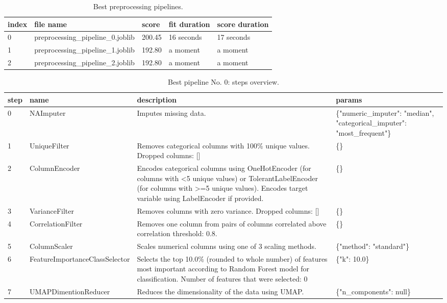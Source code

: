 \documentclass{article}%
\begin{document}
%


\begin{table}[H]%
\begin{center}%
\renewcommand{\arraystretch}{1.5}%
\begin{tabular}{l l l l l}%
\hline%
\textbf{index}&\textbf{file name}&\textbf{score}&\textbf{fit duration}&\textbf{score duration}\\%
\hline%
0&preprocessing\_pipeline\_0.joblib&200.45&16 seconds&17 seconds\\%
1&preprocessing\_pipeline\_1.joblib&192.80&a moment&a moment\\%
2&preprocessing\_pipeline\_2.joblib&192.80&a moment&a moment\\%
\hline%
\end{tabular}%
\end{center}%
\caption{Best preprocessing pipelines.}%
\end{table}

%


\begin{table}[H]%
\begin{center}%
\renewcommand{\arraystretch}{1.5}%
\begin{tabular}{p{7mm} p{50mm} p{80mm} p{40mm}}%
\hline%
\textbf{step}&\textbf{name}&\textbf{description}&\textbf{params}\\%
\hline%
0&NAImputer&Imputes missing data.&\{"numeric\_imputer": "median", "categorical\_imputer": "most\_frequent"\}\\%
1&UniqueFilter&Removes categorical columns with 100\% unique values. Dropped columns: {[}{]}&\{\}\\%
2&ColumnEncoder&Encodes categorical columns using OneHotEncoder (for columns with <5 unique values) or TolerantLabelEncoder (for columns with >=5 unique values). Encodes target variable using LabelEncoder if provided.&\{\}\\%
3&VarianceFilter&Removes columns with zero variance. Dropped columns: {[}{]}&\{\}\\%
4&CorrelationFilter&Removes one column from pairs of columns correlated above correlation threshold: 0.8.&\{\}\\%
5&ColumnScaler&Scales numerical columns using one of 3 scaling methods.&\{"method": "standard"\}\\%
6&FeatureImportanceClassSelector&Selects the top 10.0\% (rounded to whole number) of features most important according to Random Forest model for classification. Number of features that were selected: 0&\{"k": 10.0\}\\%
7&UMAPDimentionReducer&Reduces the dimensionality of the data using UMAP.&\{"n\_components": null\}\\%
\hline%
\end{tabular}%
\end{center}%
\caption{Best pipeline No. 0: steps overview.}%
\end{table}
\end{document}
